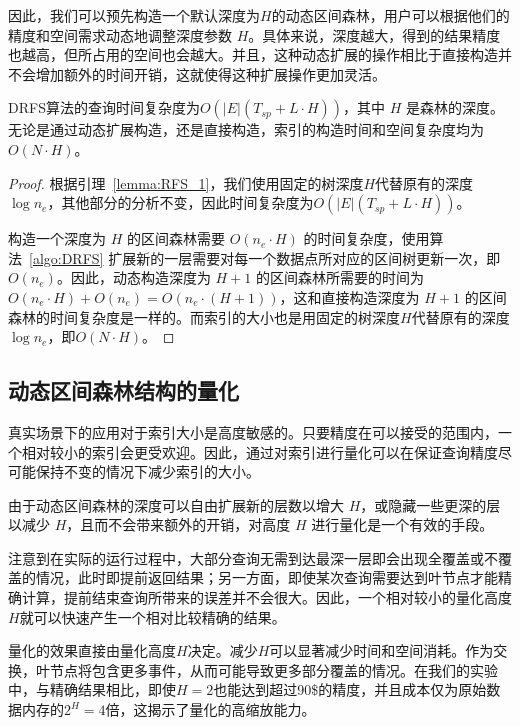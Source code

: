 	因此，我们可以预先构造一个默认深度为$H$的动态区间森林，用户可以根据他们的精度和空间需求动态地调整深度参数 $H$。具体来说，深度越大，得到的结果精度也越高，但所占用的空间也会越大。并且，这种动态扩展的操作相比于直接构造并不会增加额外的时间开销，这就使得这种扩展操作更加灵活。

	\begin{lemma}
		DRFS算法的查询时间复杂度为$O(\vert E \vert (T_{sp} + L \cdot H))$，其中 $H$ 是森林的深度。无论是通过动态扩展构造，还是直接构造，索引的构造时间和空间复杂度均为$O(N \cdot H)$。
	\end{lemma}
	\begin{proof}
		根据引理~\ref{lemma:RFS_1}，我们使用固定的树深度$H$代替原有的深度 $\log{n_e}$，其他部分的分析不变，因此时间复杂度为$O(\vert E \vert (T_{sp} + L \cdot H))$。
		
		构造一个深度为 $H$ 的区间森林需要 $O(n_e \cdot H)$ 的时间复杂度，使用算法~\ref{algo:DRFS} 扩展新的一层需要对每一个数据点所对应的区间树更新一次，即$O(n_e)$。因此，动态构造深度为 $H+1$ 的区间森林所需要的时间为 $O(n_e \cdot H) + O(n_e) = O(n_e \cdot (H+1))$，这和直接构造深度为 $H+1$ 的区间森林的时间复杂度是一样的。而索引的大小也是用固定的树深度$H$代替原有的深度 $\log{n_e}$，即$O(N \cdot H)$。
	\end{proof}


\subsection{动态区间森林结构的量化}

	真实场景下的应用对于索引大小是高度敏感的。只要精度在可以接受的范围内，一个相对较小的索引会更受欢迎。因此，通过对索引进行量化可以在保证查询精度尽可能保持不变的情况下减少索引的大小。
	
	由于动态区间森林的深度可以自由扩展新的层数以增大 $H$，或隐藏一些更深的层以减少 $H$，且而不会带来额外的开销，对高度 $H$ 进行量化是一个有效的手段。
	
	注意到在实际的运行过程中，大部分查询无需到达最深一层即会出现全覆盖或不覆盖的情况，此时即提前返回结果；另一方面，即使某次查询需要达到叶节点才能精确计算，提前结束查询所带来的误差并不会很大。因此，一个相对较小的量化高度$H$就可以快速产生一个相对比较精确的结果。

	量化的效果直接由量化高度$H$决定。减少$H$可以显著减少时间和空间消耗。作为交换，叶节点将包含更多事件，从而可能导致更多部分覆盖的情况。在我们的实验中，与精确结果相比，即使$H=2$也能达到超过90\$的精度，并且成本仅为原始数据内存的$2^{H}=4$倍，这揭示了量化的高缩放能力。

